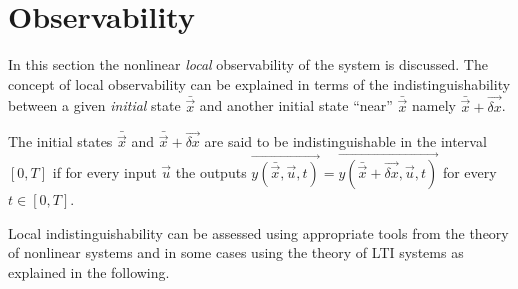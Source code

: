 \section{Observability}
In this section the nonlinear \emph{local} observability of the system is discussed.
The concept of local observability can be explained in terms of the indistinguishability
between a given \emph{initial} state $\bar{\vec{x}}$ and another initial state ``near'' $\bar{\vec{x}}$ namely
$\bar{\vec{x}} + \vec{\delta x}$.
\par
The initial states $\bar{\vec{x}}$ and $\bar{\vec{x}} + \vec{\delta x}$ are said to be
indistinguishable in the interval $[0, T]$ if for every input $\vec{u}$ the outputs
$\vec{y(\bar{\vec{x}}, \vec{u}, t)} = \vec{y(\bar{\vec{x}} + \vec{\delta x}, \vec{u}, t)}$
for every $t \in [0, T]$.
\par
Local indistinguishability can be assessed using appropriate tools from the theory
of nonlinear systems and in some cases using the theory of LTI systems as explained
in the following.

